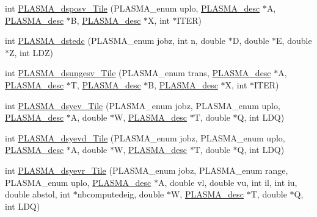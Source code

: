 \begin{DoxyCompactItemize}
\item 
int \hyperlink{group__double__Tile_ga7f39f625536bebba5fb1638c19f11af7_ga7f39f625536bebba5fb1638c19f11af7}{P\+L\+A\+S\+M\+A\+\_\+dsposv\+\_\+\+Tile} (P\+L\+A\+S\+M\+A\+\_\+enum uplo, \hyperlink{structplasma__desc__t}{P\+L\+A\+S\+M\+A\+\_\+desc} $\ast$A, \hyperlink{structplasma__desc__t}{P\+L\+A\+S\+M\+A\+\_\+desc} $\ast$B, \hyperlink{structplasma__desc__t}{P\+L\+A\+S\+M\+A\+\_\+desc} $\ast$X, int $\ast$I\+T\+E\+R)
\item 
int \hyperlink{group__double__Tile_ga066d8520cd86175fa6c85c3af0847b2f_ga066d8520cd86175fa6c85c3af0847b2f}{P\+L\+A\+S\+M\+A\+\_\+dstedc} (P\+L\+A\+S\+M\+A\+\_\+enum jobz, int n, double $\ast$D, double $\ast$E, double $\ast$Z, int L\+D\+Z)
\item 
int \hyperlink{group__double__Tile_gac91c78346c7fbb5e0e5a5b2e1240d5de_gac91c78346c7fbb5e0e5a5b2e1240d5de}{P\+L\+A\+S\+M\+A\+\_\+dsungesv\+\_\+\+Tile} (P\+L\+A\+S\+M\+A\+\_\+enum trans, \hyperlink{structplasma__desc__t}{P\+L\+A\+S\+M\+A\+\_\+desc} $\ast$A, \hyperlink{structplasma__desc__t}{P\+L\+A\+S\+M\+A\+\_\+desc} $\ast$T, \hyperlink{structplasma__desc__t}{P\+L\+A\+S\+M\+A\+\_\+desc} $\ast$B, \hyperlink{structplasma__desc__t}{P\+L\+A\+S\+M\+A\+\_\+desc} $\ast$X, int $\ast$I\+T\+E\+R)
\item 
int \hyperlink{group__double__Tile_ga8cda63fcfe13d5832061c83da54a3c65_ga8cda63fcfe13d5832061c83da54a3c65}{P\+L\+A\+S\+M\+A\+\_\+dsyev\+\_\+\+Tile} (P\+L\+A\+S\+M\+A\+\_\+enum jobz, P\+L\+A\+S\+M\+A\+\_\+enum uplo, \hyperlink{structplasma__desc__t}{P\+L\+A\+S\+M\+A\+\_\+desc} $\ast$A, double $\ast$W, \hyperlink{structplasma__desc__t}{P\+L\+A\+S\+M\+A\+\_\+desc} $\ast$T, double $\ast$Q, int L\+D\+Q)
\item 
int \hyperlink{group__double__Tile_ga05a5778227d03611aa7630b502d59ad6_ga05a5778227d03611aa7630b502d59ad6}{P\+L\+A\+S\+M\+A\+\_\+dsyevd\+\_\+\+Tile} (P\+L\+A\+S\+M\+A\+\_\+enum jobz, P\+L\+A\+S\+M\+A\+\_\+enum uplo, \hyperlink{structplasma__desc__t}{P\+L\+A\+S\+M\+A\+\_\+desc} $\ast$A, double $\ast$W, \hyperlink{structplasma__desc__t}{P\+L\+A\+S\+M\+A\+\_\+desc} $\ast$T, double $\ast$Q, int L\+D\+Q)
\item 
int \hyperlink{group__double__Tile_ga0db961bac845ed8784f19577f6854ced_ga0db961bac845ed8784f19577f6854ced}{P\+L\+A\+S\+M\+A\+\_\+dsyevr\+\_\+\+Tile} (P\+L\+A\+S\+M\+A\+\_\+enum jobz, P\+L\+A\+S\+M\+A\+\_\+enum range, P\+L\+A\+S\+M\+A\+\_\+enum uplo, \hyperlink{structplasma__desc__t}{P\+L\+A\+S\+M\+A\+\_\+desc} $\ast$A, double vl, double vu, int il, int iu, double abstol, int $\ast$nbcomputedeig, double $\ast$W, \hyperlink{structplasma__desc__t}{P\+L\+A\+S\+M\+A\+\_\+desc} $\ast$T, double $\ast$Q, int L\+D\+Q)

\end{DoxyCompactItemize}
